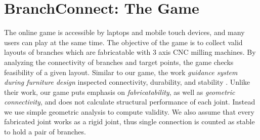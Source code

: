 \section{BranchConnect: The Game}
\label{sec:game}
The online game is accessible by laptops and mobile touch devices, and many users can play at the same time.
The objective of the game is to collect valid layouts of branches which are fabricatable with 3 axis CNC milling machines.
By analyzing the connectivity of branches and target points, the game checks feasibility of a given layout.
Similar to our game, the work \textit{guidance system during furniture design} inspected connectivity, durability, and stability \cite{umetani2012guided}.
Unlike their work, our game puts emphasis on \textit{fabricatability}, as well as \textit{geometric connectivity}, and does not calculate structural performance of each joint.
Instead we use simple geometric analysis to compute validity.
We also assume that every fabricated joint works as a rigid joint, thus single connection is counted as stable to hold a pair of branches.



